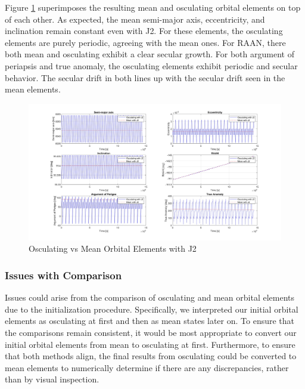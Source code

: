 Figure \ref{fig:osc_mean_oe} superimposes the resulting mean and osculating orbital elements on top of each other. As expected, the mean semi-major axis, eccentricity, and inclination remain constant even with J2. For these elements, the osculating elements are purely periodic, agreeing with the mean ones. For RAAN, there both mean and osculating exhibit a clear secular growth. For both argument of periapsis and true anomaly, the osculating elements exhibit periodic and secular behavior. The secular drift in both lines up with the secular drift seen in the mean elements.

\begin{figure}[H]
    \centering
    \includegraphics[width=1.1\linewidth]{PS1/Figures/OE_mean_osc_J2_comparison.jpg}
    \caption{Osculating vs Mean Orbital Elements with J2}
    \label{fig:osc_mean_oe}
\end{figure}

\subsubsection{Issues with Comparison}
Issues could arise from the comparison of osculating and mean orbital elements due to the initialization procedure. Specifically, we interpreted our initial orbital elements as osculating at first and then as mean states later on. To ensure that the comparisons remain consistent, it would be most appropriate to convert our initial orbital elements from mean to osculating at first. Furthermore, to ensure that both methods align, the final results from osculating could be converted to mean elements to numerically determine if there are any discrepancies, rather than by visual inspection.
